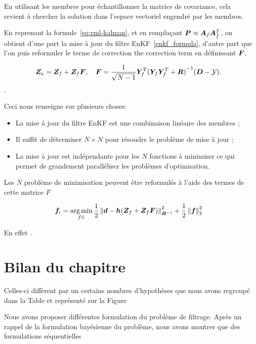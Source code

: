 En utilisant les membres pour échantillonner la matrice de covariance, cela revient à chercher la solution dans l'espace vectoriel engendré par les membres.

En reprenant la formule~\ref{eq:rml-kalman}, et en remplaçant $\bm P \approx \bm A_f \bm A_f^T$, on obtient d'une part la mise à jour du filtre EnKF~\ref{enkf_formula}, d'autre part que l'on puis reformuler le terme de correction the correction term en définissant $\bm{F}$,

\begin{equation}
    \bm{Z}_a = \bm{Z}_f + \bm{Z}_f \bm{F}, \quad \bm{F} = \frac{1}{\sqrt{N-1}} \bm Y_f^T {(\bm Y_f \bm Y_f^T + \bm R)}^{-1}(\bm{D} - \mathcal{Y}).
\end{equation}.

Ceci nous renseigne sur plusieurs choses:
\begin{itemize}
    \item La mise à jour du filtre EnKF est une combinaison linéaire des membres ;
    \item Il suffit de déterminer $N \times N$ pour résoudre le problème de mise à jour ;
    \item La mise à jour est indépendante pour les $N$ fonctions à minimiser ce qui permet de grandement paralléliser les problèmes d'optimisation.
\end{itemize}

Les $N$ problème de minimisation peuvent être reformulés à l'aide des termes de cette matrice $F$

\begin{equation*}
    \bm f_i = \operatorname*{arg\,min}_{f \in } \frac12 \left\lVert \bm d - \bm h(\bm{Z}_f + \bm{Z}_f \bm{F}) \right\rVert^2_{\bm R^{-1}} + \frac12 \left\lVert \bm f \right\rVert_2^2
\end{equation*}

En effet .

\section{Bilan du chapitre}

Celles-ci diffèrent par un certains nombres d'hypothèses que nous avons regroupé dans la Table et représenté sur la Figure

Nous avons proposer différentes formulation du problème de filtrage. Après un rappel de la formulation bayésienne du problème, nous avons montrer que des formulations séquentielles


